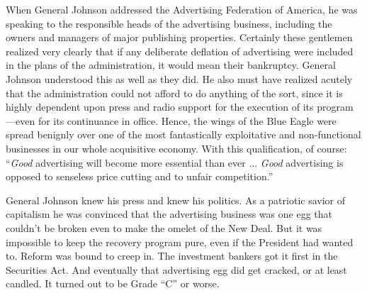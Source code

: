\documentclass[twoside,nohyper,openany,nobib]{tufte-book}
\begin{document}
\pagebreak When General Johnson addressed the Advertising Federation of America, he
was speaking to the responsible heads of the advertising business,
including the owners and managers of major publishing properties.
Certainly these gentlemen realized very clearly that if any deliberate
deflation of advertising were included in the plans of the
administration, it would mean their bankruptcy. General Johnson
understood this as well as they did. He also must have realized acutely
that the administration could not afford to do anything of the sort,
since it is highly dependent upon press and radio support for the
execution of its program---even for its continuance in office. Hence,
the wings of the Blue Eagle were spread benignly over one of the most
fantastically exploitative and non-functional businesses in our whole
acquisitive economy. With this qualification, of course: ``\emph{Good}
advertising will become more essential than ever ... \emph{Good}
advertising is opposed to senseless price cutting and to unfair
competition.''

General Johnson knew his press and knew his politics. As a patriotic
savior of capitalism he was convinced that the advertising business was
one egg that couldn't be broken even to make the omelet of the New Deal.
But it was impossible to keep the recovery program pure, even if the
President had wanted to. Reform was bound to creep in. The investment
bankers got it first in the Securities Act. And eventually that
advertising egg did get cracked, or at least candled. It turned out to
be Grade ``C'' or worse.
\end{document}
